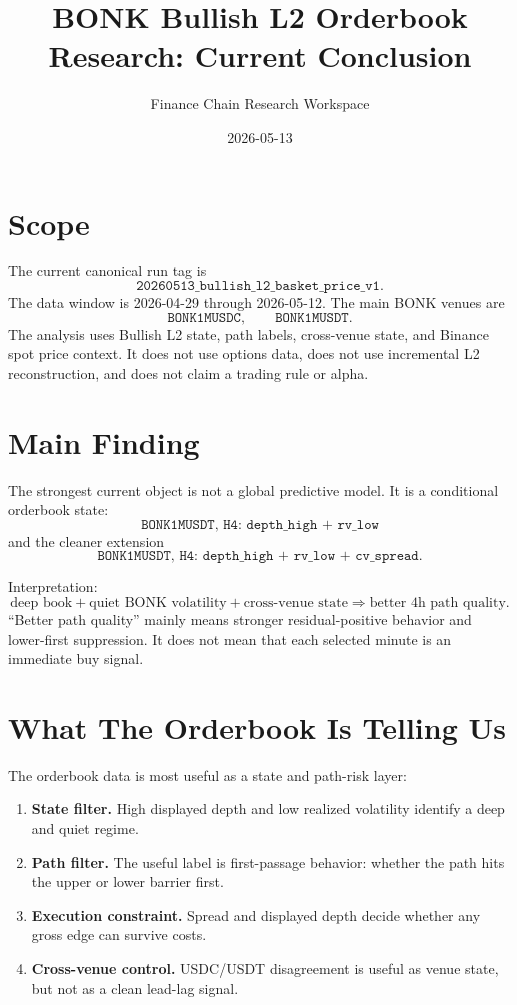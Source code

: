 \documentclass[11pt]{article}
\title{BONK Bullish L2 Orderbook Research: Current Conclusion}
\author{Finance Chain Research Workspace}
\date{2026-05-13}
\begin{document}
\maketitle

\section{Scope}

The current canonical run tag is
\[
  \texttt{20260513\_bullish\_l2\_basket\_price\_v1}.
\]
The data window is 2026-04-29 through 2026-05-12. The main BONK venues are
\[
  \texttt{BONK1MUSDC}, \qquad \texttt{BONK1MUSDT}.
\]
The analysis uses Bullish L2 state, path labels, cross-venue state, and Binance spot price context. It does not use options data, does not use incremental L2 reconstruction, and does not claim a trading rule or alpha.

\section{Main Finding}

The strongest current object is not a global predictive model. It is a conditional orderbook state:
\[
  \texttt{BONK1MUSDT, H4: depth\_high + rv\_low}
\]
and the cleaner extension
\[
  \texttt{BONK1MUSDT, H4: depth\_high + rv\_low + cv\_spread}.
\]

Interpretation:
\[
  \text{deep book} + \text{quiet BONK volatility} + \text{cross-venue state}
  \Rightarrow
  \text{better 4h path quality}.
\]
``Better path quality'' mainly means stronger residual-positive behavior and lower-first suppression. It does not mean that each selected minute is an immediate buy signal.

\section{What The Orderbook Is Telling Us}

The orderbook data is most useful as a state and path-risk layer:
\begin{enumerate}
  \item \textbf{State filter.} High displayed depth and low realized volatility identify a deep and quiet regime.
  \item \textbf{Path filter.} The useful label is first-passage behavior: whether the path hits the upper or lower barrier first.
  \item \textbf{Execution constraint.} Spread and displayed depth decide whether any gross edge can survive costs.
  \item \textbf{Cross-venue control.} USDC/USDT disagreement is useful as venue state, but not as a clean lead-lag signal.
\end{enumerate}
\end{document}
